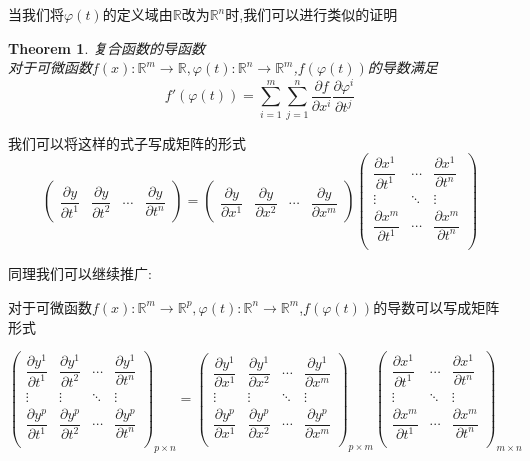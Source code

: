 \documentclass[11pt,hyperref,a4paper,UTF8]{ctexart}
\newtheorem{theorem}{Theorem}[subsection]
\newcommand{\RR}{\mathbb{R}}
\begin{document}
\begin{CJK}{UTF8}{gkai}
当我们将$\varphi(t)$的定义域由$\RR$改为$\RR^n$时,我们可以进行类似的证明

\begin{theorem}
  复合函数的导函数\\

  对于可微函数$f(x):\RR^m \to \RR ,\varphi(t): \RR^n \to \RR^m$,$f(\varphi(t))$的导数满足
  \[f'(\varphi(t)) = \sum_{i = 1}^{m}\sum_{j = 1}^{n} \frac{\partial f}{\partial x^i}\frac{\partial \varphi^i}{\partial t^j}  \]
\end{theorem}
我们可以将这样的式子写成矩阵的形式
\[\begin{pmatrix}
  \dfrac{\partial y}{\partial t^1}&\dfrac{\partial y}{\partial t^2}&\cdots&\dfrac{\partial y}{\partial t^n}
\end{pmatrix} = \begin{pmatrix}
  \dfrac{\partial y}{\partial x^1}&\dfrac{\partial y}{\partial x^2}&\cdots&\dfrac{\partial y}{\partial x^m}
\end{pmatrix} \begin{pmatrix}
  \dfrac{\partial x^1}{\partial t^1}&\cdots&\dfrac{\partial x^1}{\partial t^n}\\
  \vdots&\ddots&\vdots\\
  \dfrac{\partial x^m}{\partial t^1}&\cdots&\dfrac{\partial x^m}{\partial t^n}\\
\end{pmatrix}\]

同理我们可以继续推广:

对于可微函数$f(x):\RR^m \to \RR^p ,\varphi(t): \RR^n \to \RR^m$,$f(\varphi(t))$的导数可以写成矩阵形式

\[\begin{pmatrix}
  \dfrac{\partial y^1}{\partial t^1}&\dfrac{\partial y^1}{\partial t^2}&\cdots&\dfrac{\partial y^1}{\partial t^n}\\
  \vdots&\vdots&\ddots&\vdots\\
  \dfrac{\partial y^p}{\partial t^1}&\dfrac{\partial y^p}{\partial t^2}&\cdots&\dfrac{\partial y^p}{\partial t^n}\\
\end{pmatrix}_{p \times n} = \begin{pmatrix}
  \dfrac{\partial y^1}{\partial x^1}&\dfrac{\partial y^1}{\partial x^2}&\cdots&\dfrac{\partial y^1}{\partial x^m}\\
  \vdots&\vdots&\ddots&\vdots\\
  \dfrac{\partial y^p}{\partial x^1}&\dfrac{\partial y^p}{\partial x^2}&\cdots&\dfrac{\partial y^p}{\partial x^m}\\
\end{pmatrix}_{p \times m} \begin{pmatrix}
  \dfrac{\partial x^1}{\partial t^1}&\cdots&\dfrac{\partial x^1}{\partial t^n}\\
  \vdots&\ddots&\vdots\\
  \dfrac{\partial x^m}{\partial t^1}&\cdots&\dfrac{\partial x^m}{\partial t^n}\\
\end{pmatrix}_{m \times n}\]


\end{CJK}
\end{document}
